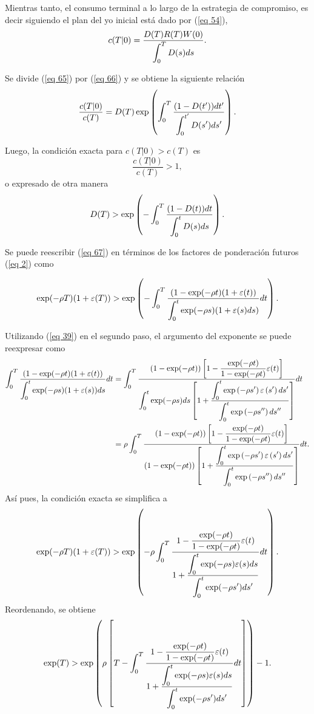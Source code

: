 Mientras tanto, el consumo terminal a lo largo de la estrategia de compromiso, es decir siguiendo el plan del yo inicial está dado por (\ref{eq 54}),
\begin{equation}
\label{eq 66}
c(T|0)= \dfrac{D(T) R(T) W(0)}{\displaystyle \int_0^T D(s) ds}.
\end{equation}

\noindent Se divide (\ref{eq 65}) por (\ref{eq 66}) y se obtiene la siguiente relación
$$\dfrac{c(T|0)}{c(T)}= D(T) \exp \left( \displaystyle \int_0^T \dfrac{(1- D(t')) dt'}{\displaystyle \int_0^{t'} D(s') ds'} \right).$$


\noindent Luego, la condición exacta para $c(T|0) > c(T)$ es
$$\dfrac{c(T|0)}{c(T)}>1,$$
o expresado de otra manera
\begin{equation}
\label{eq 67}
    D(T)> \exp \left( - \displaystyle \int_0^T \dfrac{(1- D(t)) dt}{\displaystyle \int_0^{t} D(s) ds}\right).
\end{equation}

Se puede reescribir (\ref{eq 67}) en términos de los factores de ponderación futuros (\ref{eq 2}) como

$$\exp (- \rho T) (1+ \varepsilon(T))> \exp \left(- \displaystyle \int_0^T \dfrac{(1- \exp (- \rho t) (1+ \varepsilon(t))}{\displaystyle \int_0^t \exp (- \rho s) (1+ \varepsilon(s) ds)}dt \right).$$

\noindent Utilizando (\ref{eq 39}) en el segundo paso, el argumento del exponente se puede reexpresar como
$$
\begin{aligned}
\displaystyle \int_0^T \dfrac{(1-\exp (-\rho t)(1+\varepsilon(t))}{\displaystyle \int_0^t \exp (-\rho s)(1+\varepsilon(s)) d s} d t & =\displaystyle \int_0^T \dfrac{(1-\exp (-\rho t))\left[1-\dfrac{\exp (-\rho t)}{1-\exp (-\rho t)} \varepsilon(t)\right]}{\displaystyle \int_0^t \exp (-\rho s) d s\left[1+\dfrac{\displaystyle \int_0^t \exp \left(-\rho s^{\prime}\right) \varepsilon\left(s^{\prime}\right) d s^{\prime}}{\displaystyle \int_0^t \exp \left(-\rho s^{\prime \prime}\right) d s^{\prime \prime}}\right]} d t \\
& =\rho \displaystyle \int_0^T \dfrac{(1-\exp (-\rho t))\left[1-\dfrac{\exp (-\rho t)}{1-\exp (-\rho t)} \varepsilon(t)\right]}{(1-\exp (-\rho t))\left[1+\dfrac{\displaystyle \int_0^t \exp \left(-\rho s^{\prime}\right) \varepsilon\left(s^{\prime}\right) d s^{\prime}}{\displaystyle \int_0^t \exp \left(-\rho s^{\prime \prime}\right) d s^{\prime \prime}}\right]} d t.
\end{aligned}
$$
%
\noindent Así pues, la condición exacta se simplifica a
$$\exp (-\rho T) (1+ \varepsilon(T)) > \exp \left( -\rho \displaystyle \int_0^T \dfrac{1- \dfrac{\exp ( - \rho t)}{1- \exp ( - \rho t)} \varepsilon(t)}{1+ \dfrac{\displaystyle \int_0^t \exp (- \rho s) \varepsilon(s)ds}{\displaystyle \int_0^t \exp(- \rho s') ds'}} dt \right).$$
%
\noindent Reordenando, se obtiene
\begin{equation}
\label{eq 68} 
\exp (T) > \exp \left( \rho \left[  T-\displaystyle \int_0^T \dfrac{1- \dfrac{\exp ( - \rho t)}{1- \exp ( - \rho t)} \varepsilon(t)}{1+ \dfrac{\displaystyle \int_0^t \exp (- \rho s) \varepsilon(s)ds}{\displaystyle \int_0^t \exp(- \rho s') ds'}} dt \right] \right) -1.
\end{equation}

